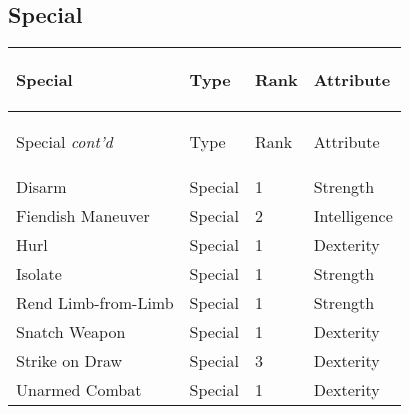 \documentclass[twoside]{book}
\begin{document}
    

\subsection{Special}
    
\begin{longtable}{p{1.25in}lll} 
  Special
  &
  \begin{turn}{70}{Type}\end{turn}
          
  &
  \begin{turn}{70}{Rank}\end{turn}
          
  &
  \begin{turn}{70}{Attribute}\end{turn}
          
  \\
  \hline
  \hline
  \endfirsthead
  Special \textit{cont'd}
        
  &
  \begin{turn}{70}{Type}\end{turn}
          
  &
  \begin{turn}{70}{Rank}\end{turn}
          
  &
  \begin{turn}{70}{Attribute}\end{turn}
          
  \\
  \hline
  \endhead
      
  \raggedright
           Disarm 
  &
   Special 
  &
   1 
  &
   Strength 
  \tabularnewline
      
  \raggedright
           Fiendish Maneuver 
  &
   Special 
  &
   2 
  &
   Intelligence 
  \tabularnewline
      
  \raggedright
           Hurl 
  &
   Special 
  &
   1 
  &
   Dexterity 
  \tabularnewline
      
  \raggedright
           Isolate 
  &
   Special 
  &
   1 
  &
   Strength 
  \tabularnewline
      
  \raggedright
           Rend Limb-from-Limb 
  &
   Special 
  &
   1 
  &
   Strength 
  \tabularnewline
      
  \raggedright
           Snatch Weapon 
  &
   Special 
  &
   1 
  &
   Dexterity 
  \tabularnewline
      
  \raggedright
           Strike on Draw 
  &
   Special 
  &
   3 
  &
   Dexterity 
  \tabularnewline
      
  \raggedright
           Unarmed Combat 
  &
   Special 
  &
   1 
  &
   Dexterity 
  \tabularnewline
      
\end{longtable}
    
\end{document}
